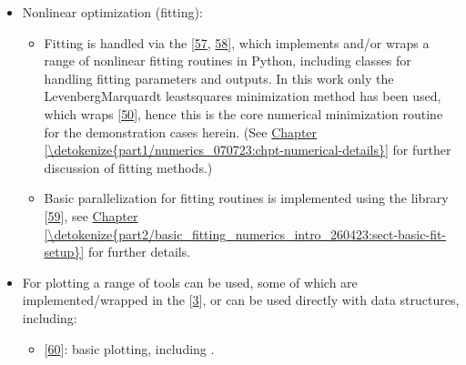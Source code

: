 \documentclass[letterpaper,table,10pt,english]{jupyterBook}
\begin{document}
\begin{itemize}
\item {} 
\sphinxAtStartPar
Non\sphinxhyphen{}linear optimization (fitting):
\begin{itemize}
\item {} 
\sphinxAtStartPar
Fitting is handled via the  {[}\hyperlink{cite.backmatter/bibliography:id741}{57}, \hyperlink{cite.backmatter/bibliography:id787}{58}{]}, which implements and/or wraps a range of non\sphinxhyphen{}linear fitting routines in Python, including classes for handling fitting parameters and outputs. In this work only the Levenberg\sphinxhyphen{}Marquardt least\sphinxhyphen{}squares minimization method has been used, which wraps  {[}\hyperlink{cite.backmatter/bibliography:id857}{50}{]}, hence this is the core numerical minimization routine for the demonstration cases herein. (See \hyperref[\detokenize{part1/numerics_070723:chpt-numerical-details}]{Chapter \ref{\detokenize{part1/numerics_070723:chpt-numerical-details}}} for further discussion of fitting methods.)

\item {} 
\sphinxAtStartPar
Basic parallelization for fitting routines is implemented using the  library {[}\hyperlink{cite.backmatter/bibliography:id954}{59}{]}, see \hyperref[\detokenize{part2/basic_fitting_numerics_intro_260423:sect-basic-fit-setup}]{Chapter \ref{\detokenize{part2/basic_fitting_numerics_intro_260423:sect-basic-fit-setup}}} for further details.

\end{itemize}

\item {} 
\sphinxAtStartPar
For plotting a range of tools can be used, some of which are implemented/wrapped in the  {[}\hyperlink{cite.backmatter/bibliography:id668}{3}{]}, or can be used directly with  data structures, including:
\begin{itemize}
\item {} 
\sphinxAtStartPar
{} {[}\hyperlink{cite.backmatter/bibliography:id761}{60}{]}: basic plotting, including .


\end{itemize}
\end{itemize}
\end{document}
